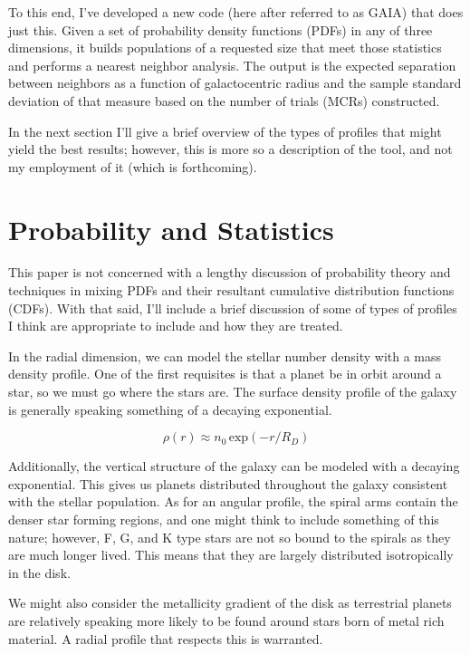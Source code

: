 \documentclass[10pt,a4paper,final]{article}
\numberwithin{equation}{section}
\begin{document}
\begin{multicols}{2}[]
			To this end, I've developed a new code (here after referred to as GAIA) that does just
			this. Given a set of probability density functions (PDFs) in any of three dimensions,
			it builds populations of a requested size that meet those statistics and performs
			a nearest neighbor analysis. The output is the expected separation between neighbors
			as a function of galactocentric radius and the sample standard deviation of that measure
			based on the number of trials (MCRs) constructed.

			In the next section I'll give a brief overview of the types of profiles that might yield
			the best results; however, this is more so a description of the tool, and not my employment
			of it (which is forthcoming).

		\section{Probability and Statistics}
	
			This paper is not concerned with a lengthy discussion of probability theory
			and techniques in mixing PDFs and their resultant cumulative distribution
			functions (CDFs). With that said, I'll include a brief discussion of some
			of types of profiles I think are appropriate to include and how they are 
			treated.

			In the radial dimension, we can model the stellar number density with a mass
			density profile. One of the first requisites is that a planet be in orbit
			around a star, so we must go where the stars are. The surface density profile
			of the galaxy is generally speaking something of a decaying exponential.

			\begin{equation}
				\rho(r) \approx n_0 \, \text{exp}\left( -r / R_D \right)
			\end{equation}
		
			Additionally, the vertical structure of the galaxy can be modeled with a decaying
			exponential. This gives us planets distributed throughout the galaxy consistent
			with the stellar population. As for an angular profile, the spiral arms contain
			the denser star forming regions, and one might think to include something of this
			nature; however, F, G, and K type stars are not so bound to the spirals as they
			are much longer lived. This means that they are largely distributed isotropically
			in the disk.

			We might also consider the metallicity gradient of the disk as terrestrial planets
			are relatively speaking more likely to be found around stars born of metal rich
			material. A radial profile that respects this is warranted.


\end{multicols}
\end{document}
